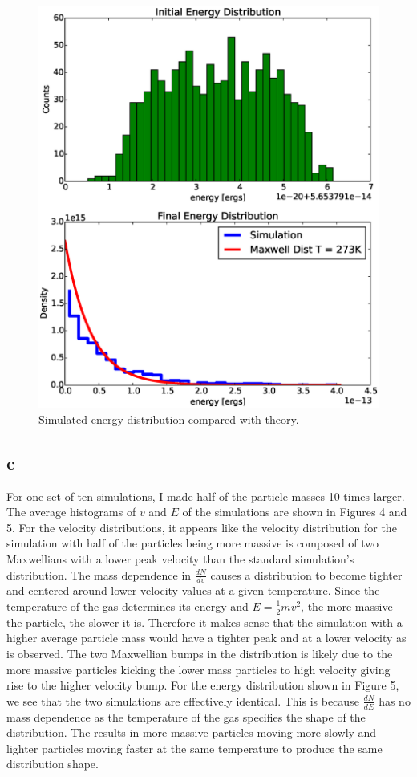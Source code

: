 \documentclass[12pt]{amsart}
\begin{document}
\begin{figure}[h!]
  \centering
    \includegraphics[width=1.0\textwidth]{energy_dist.eps}
    \caption{Simulated energy distribution compared with theory.}
\end{figure}

\subsection{c}

For one set of ten simulations, I made half of the particle masses 10 times larger.  The average histograms of $v$ and $E$ of the simulations are shown in Figures 4 and 5.  For the velocity distributions, it appears like the velocity distribution for the simulation with half of the particles being more massive is composed of two Maxwellians with a lower peak velocity than the standard simulation's distribution.  The mass dependence in $\frac{dN}{dv}$ causes a distribution to become tighter and centered around lower velocity values at a given temperature.  Since the temperature of the gas determines its energy and $E = \frac{1}{2}mv^2$, the more massive the particle, the slower it is.  Therefore it makes sense that the simulation with a higher average particle mass would have a tighter peak and at a lower velocity as is observed.  The two Maxwellian bumps in the distribution is likely due to the more massive particles kicking the lower mass particles to high velocity giving rise to the higher velocity bump.  For the energy distribution shown in Figure 5, we see that the two simulations are effectively identical.  This is because $\frac{dN}{dE}$ has no mass dependence as the temperature of the gas specifies the shape of the distribution.  The results in more massive particles moving more slowly and lighter particles moving faster at the same temperature to produce the same distribution shape.
\end{document}
